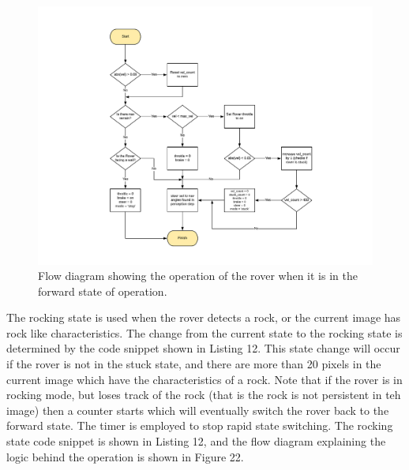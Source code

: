 \documentclass[a4paper]{article}
\begin{document}
\newpage

\begin{figure}[h]
\hspace{-1.5cm}
\vspace{4cm}
\includegraphics[scale = 0.7]{forward_flow}
\vspace{-3cm}
\caption{Flow diagram showing the operation of the rover when it is in the forward state of operation.}
\end{figure}

\newpage

The rocking state is used when the rover detects a rock, or the current image has rock like characteristics. The change from the current state to the rocking state is determined by the code snippet shown in Listing 12. This state change will occur if the rover is not in the stuck state, and there are more than 20 pixels in the current image which have the characteristics of a rock. Note that if the rover is in rocking mode, but loses track of the rock (that is the rock is not persistent in teh image) then a counter starts which will eventually switch the rover back to the forward state. The timer is employed to stop rapid state switching. The rocking state code snippet is shown in Listing 12, and the flow diagram explaining the logic behind the operation is shown in Figure 22.\\
\end{document}
